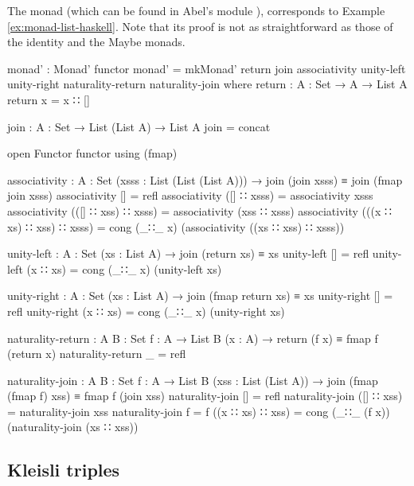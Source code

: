 \begin{example}
  \label{ex:monad-list-agda}

  The  monad (which can be found in Abel's module
  ), corresponds to Example
  \ref{ex:monad-list-haskell}. Note that its proof is not as
  straightforward as those of the identity and the Maybe monads.
  \begin{codeagda}
monad' : Monad' functor
monad' = mkMonad' return join associativity unity-left unity-right
                  naturality-return naturality-join
  where
    return : {A : Set} → A → List A
    return x = x ∷ []

    join : {A : Set} → List (List A) → List A
    join = concat

    open Functor functor using (fmap)

    associativity : {A : Set} (xsss : List (List (List A))) →
                    join (join xsss) ≡ join (fmap join xsss)
    associativity []                        = refl
    associativity ([] ∷ xsss)               = associativity xsss
    associativity (([] ∷ xss) ∷ xsss)       = associativity (xss ∷ xsss)
    associativity (((x ∷ xs) ∷ xss) ∷ xsss) =
      cong (_∷_ x) (associativity ((xs ∷ xss) ∷ xsss))

    unity-left : {A : Set} (xs : List A) → join (return xs) ≡ xs
    unity-left []       = refl
    unity-left (x ∷ xs) = cong (_∷_ x) (unity-left xs)

    unity-right : {A : Set} (xs : List A) → join (fmap return xs) ≡ xs
    unity-right []       = refl
    unity-right (x ∷ xs) = cong (_∷_ x) (unity-right xs)

    naturality-return : {A B : Set} {f : A → List B} (x : A) →
                        return (f x) ≡ fmap f (return x)
    naturality-return _ = refl

    naturality-join : {A B : Set} {f : A → List B} (xss : List (List A)) →
                      join (fmap (fmap f) xss) ≡ fmap f (join xss)
    naturality-join         []               = refl
    naturality-join         ([] ∷ xss)       = naturality-join xss
    naturality-join {f = f} ((x ∷ xs) ∷ xss) =
      cong (_∷_ (f x)) (naturality-join (xs ∷ xss))
  \end{codeagda}

\end{example}

\subsection*{Kleisli triples}

